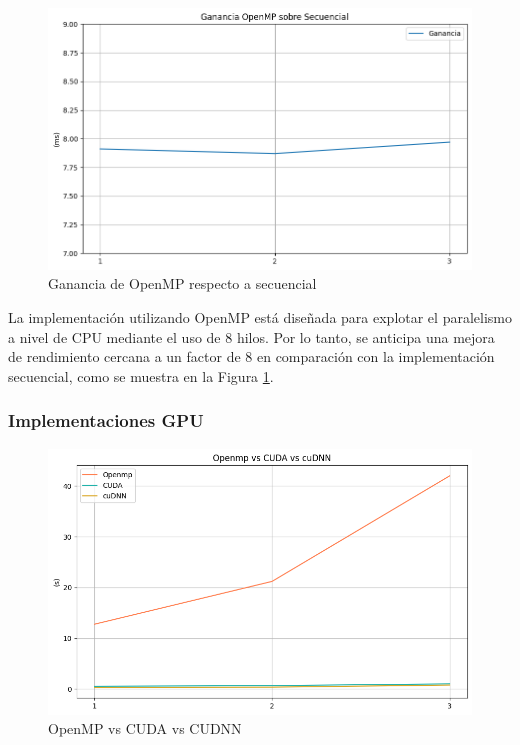 \begin{figure}[H]
	\centering
	\includegraphics[scale=0.5]{imagenes/ganancia_sec_openmp.png}  
	\caption{Ganancia de OpenMP respecto a secuencial}
	\label{fig:ganancia_sec_openmp}
\end{figure}

La implementación utilizando OpenMP está diseñada para explotar el paralelismo a nivel de CPU mediante el uso de 8 hilos. Por lo tanto, se anticipa una mejora de rendimiento cercana a un factor de 8 en comparación con la implementación secuencial, como se muestra en la Figura \ref{fig:ganancia_sec_openmp}.

\vspace{10mm}

\subsubsection{Implementaciones GPU}

\begin{figure}[H]
	\centering
	\includegraphics[scale=0.52]{imagenes/openmp_cuda_cudnn.png}  
	\caption{OpenMP vs CUDA vs CUDNN}
	\label{fig:openmp_cuda_cudnn}
\end{figure}


